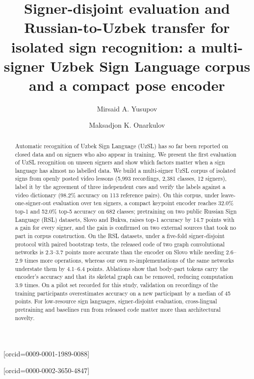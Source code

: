 \documentclass[a4paper,fleqn]{cas-dc}
\begin{document}
\let\WriteBookmarks\relax
\def\floatpagepagefraction{1}
\def\textpagefraction{.001}
\title[mode=title]{Signer-disjoint evaluation and Russian-to-Uzbek transfer for isolated sign recognition: a multi-signer Uzbek Sign Language corpus and a compact pose encoder}
\author[1]{Mirsaid A. Yusupov}[orcid=0009-0001-1989-0088]
\cormark[1]
\author[2]{Maksadjon K. Onarkulov}[orcid=0000-0002-3650-4847]
\begin{abstract}
Automatic recognition of Uzbek Sign Language (UzSL) has so far been reported on closed data and on signers who also appear in training. We present the first evaluation of UzSL recognition on unseen signers and show which factors matter when a sign language has almost no labelled data. We build a multi-signer UzSL corpus of isolated signs from openly posted video lessons (5,993 recordings, 2,381 classes, 12 signers), label it by the agreement of three independent cues and verify the labels against a video dictionary (98.2\% accuracy on 113 reference pairs). On this corpus, under leave-one-signer-out evaluation over ten signers, a compact keypoint encoder reaches 32.0\% top-1 and 52.0\% top-5 accuracy on 682 classes; pretraining on two public Russian Sign Language (RSL) datasets, Slovo and Bukva, raises top-1 accuracy by 14.7 points with a gain for every signer, and the gain is confirmed on two external sources that took no part in corpus construction. On the RSL datasets, under a five-fold signer-disjoint protocol with paired bootstrap tests, the released code of two graph convolutional networks is 2.3–3.7 points more accurate than the encoder on Slovo while needing 2.6–2.9 times more operations, whereas our own re-implementations of the same networks understate them by 4.1–6.4 points. Ablations show that body-part tokens carry the encoder's accuracy and that its skeletal graph can be removed, reducing computation 3.9 times. On a pilot set recorded for this study, validation on recordings of the training participants overestimates accuracy on a new participant by a median of 45 points. For low-resource sign languages, signer-disjoint evaluation, cross-lingual pretraining and baselines run from released code matter more than architectural novelty.
\end{abstract}
\end{document}
